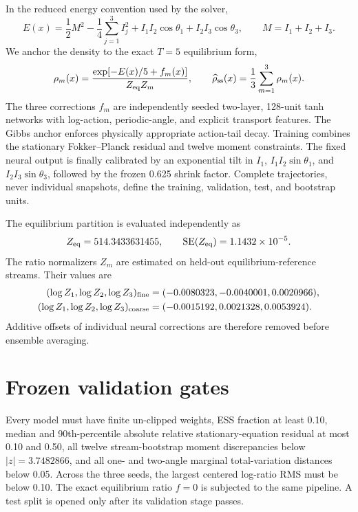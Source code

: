 \documentclass[11pt]{article}
\begin{document}
In the reduced energy convention used by the solver,
\begin{equation}
 E(x)=\frac12 M^2-\frac14\sum_{j=1}^{3}I_j^2
      +I_1I_2\cos\theta_1+I_2I_3\cos\theta_3,
 \qquad M=I_1+I_2+I_3.
\end{equation}
We anchor the density to the exact \(T=5\) equilibrium form,
\begin{equation}
 \rho_m(x)=\frac{\exp[-E(x)/5+f_m(x)]}{Z_{\rm eq}Z_m},\qquad
 \widehat\rho_{\rm ss}(x)=\frac13\sum_{m=1}^{3}\rho_m(x).
 \label{eq:full-density}
\end{equation}
The three corrections \(f_m\) are independently seeded two-layer, 128-unit
tanh networks with log-action, periodic-angle, and explicit transport
features.  The Gibbs anchor enforces physically appropriate action-tail decay.
Training combines the stationary Fokker--Planck residual and twelve moment
constraints.  The fixed neural output is finally calibrated by an exponential
tilt in \(I_1\), \(I_1I_2\sin\theta_1\), and
\(I_2I_3\sin\theta_3\), followed by the frozen 0.625 shrink factor.  Complete
trajectories, never individual snapshots, define the
training, validation, test, and bootstrap units.

The equilibrium partition is evaluated independently as
\begin{equation}
 Z_{\rm eq}=514.3433631455,\qquad
 \operatorname{SE}(Z_{\rm eq})=1.1432\times10^{-5}.
\end{equation}
The ratio normalizers \(Z_m\) are estimated on held-out equilibrium-reference
streams.  Their values are
\begin{align*}
 (\log Z_1,\log Z_2,\log Z_3)_{\rm fine}
   &=(-0.0080323,-0.0040001,0.0020966),\\
 (\log Z_1,\log Z_2,\log Z_3)_{\rm coarse}
   &=(-0.0015192,0.0021328,0.0053924).
\end{align*}
Additive offsets of individual neural corrections are therefore removed before
ensemble averaging.

\section{Frozen validation gates}

Every model must have finite un-clipped weights, ESS fraction at least 0.10,
median and 90th-percentile absolute relative stationary-equation residual at
most 0.10 and 0.50, all twelve stream-bootstrap moment discrepancies below
\(|z|=3.7482866\), and all one- and two-angle marginal total-variation distances
below 0.05.  Across the three seeds, the largest centered log-ratio RMS must be
below 0.10.  The exact equilibrium ratio \(f=0\) is subjected to the same
pipeline.  A test split is opened only after its validation stage passes.
\end{document}
